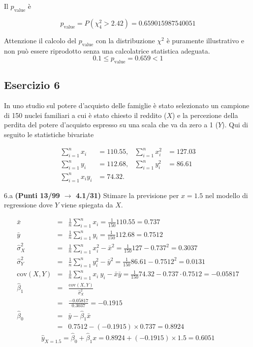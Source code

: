 \documentclass[
  11pt,
]{book}
\theoremstyle{mytheoremstyle}
\theoremstyle{mydefstyle}
\newenvironment{sol}
  {
  \begin{tcolorbox}[enhanced,breakable,arc=0.1mm,boxrule=1pt,colback=white,colframe=iblue,
  title=\bf \fontfamily{lmss}\selectfont \hspace{.5 cm} Soluzione,drop fuzzy shadow]

}{
\end{tcolorbox}
  }
\begin{document}
\begin{sol}
Il \(p_{\text{value}}\) è

\[ p_{\text{value}} = P(\chi^2_{4}>2.42)=0.659015987540051 \]

Attenzione il calcolo del \(p_\text{value}\) con la distribuzione \(\chi^2\) è puramente illustrativo e non può essere riprodotto senza una calcolatrice statistica adeguata.\[
 0.1 \leq p_\text{value}= 0.659 < 1 
\]

\end{sol}

\subsection{Esercizio 6}\label{esercizio-6-8}

In uno studio sul potere d'acquisto delle famiglie è stato selezionato un campione di 150 nuclei familiari
a cui è stato chiesto il reddito (\(X\)) e la percezione della perdita del potere d'acquisto espresso su una scala che va da zero a 1 (\(Y\)).
Qui di seguito le statistiche bivariate

\begin{align*}
\sum_{i=1}^n x_i &= 110.55,   &\sum_{i=1}^n x_i^2 &= 127.03 \\
\sum_{i=1}^n y_i &= 112.68,   &\sum_{i=1}^n y_i^2 &= 86.61 \\
\sum_{i=1}^n x_iy_i &= 74.32.    
\end{align*}

6.a \textbf{(Punti 13/99 \(\rightarrow\) 4.1/31)} Stimare la previsione per \(x=1.5\) nel modello di regressione dove \(Y\) viene spiegata da \(X\).

\begin{sol}
\begin{eqnarray*}
           \bar x &=&\frac 1 n\sum_{i=1}^n x_i = \frac {1}{ 150 }  110.55 =  0.737 \\
           \bar y &=&\frac 1 n\sum_{i=1}^n y_i = \frac {1}{ 150 }  112.68 =  0.7512 \\
           \hat\sigma_X^2&=&\frac 1 n\sum_{i=1}^n x_i^2-\bar x^2=\frac {1}{ 150 }  127  - 0.737 ^2= 0.3037 \\
           \hat\sigma_Y^2&=&\frac 1 n\sum_{i=1}^n y_i^2-\bar y^2=\frac {1}{ 150 }  86.61  - 0.7512 ^2= 0.0131 \\
           \text{cov}(X,Y)&=&\frac 1 n\sum_{i=1}^n x_i~y_i-\bar x\bar y=\frac {1}{ 150 }  74.32 - 0.737 \cdot 0.7512 = -0.05817 \\
           \hat\beta_1 &=& \frac{\text{cov}(X,Y)}{\hat\sigma_X^2} \\
                    &=& \frac{ -0.05817 }{ 0.3037 }  =  -0.1915 \\
           \hat\beta_0 &=& \bar y - \hat\beta_1 \bar x\\
                    &=&  0.7512 - (-0.1915) \times  0.737 = 0.8924 
         \end{eqnarray*}\[\hat y_{X= 1.5 }=\hat\beta_0+\hat\beta_1 x= 0.8924 + (-0.1915) \times 1.5 = 0.6051 \]

\end{sol}
\end{document}
